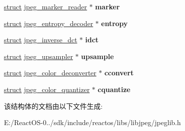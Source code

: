\begin{DoxyCompactItemize}
\hyperlink{interfacestruct}{struct} \hyperlink{structjpeg__marker__reader}{jpeg\+\_\+marker\+\_\+reader} $\ast$ {\bfseries marker}
\item 
\mbox{\label{structjpeg__decompress__struct_ac53f055b3d8103caa6c7ba4b4975eb5b}} 
\hyperlink{interfacestruct}{struct} \hyperlink{structjpeg__entropy__decoder}{jpeg\+\_\+entropy\+\_\+decoder} $\ast$ {\bfseries entropy}
\item 
\mbox{\label{structjpeg__decompress__struct_a2ef67a2829f8ecebb1af0ed440bff8bf}} 
\hyperlink{interfacestruct}{struct} \hyperlink{structjpeg__inverse__dct}{jpeg\+\_\+inverse\+\_\+dct} $\ast$ {\bfseries idct}
\item 
\mbox{\label{structjpeg__decompress__struct_a80ad7e1c14488a065697b09679479c5d}} 
\hyperlink{interfacestruct}{struct} \hyperlink{structjpeg__upsampler}{jpeg\+\_\+upsampler} $\ast$ {\bfseries upsample}
\item 
\mbox{\label{structjpeg__decompress__struct_a1f88347e58f8f9d93954aa885f3497fb}} 
\hyperlink{interfacestruct}{struct} \hyperlink{structjpeg__color__deconverter}{jpeg\+\_\+color\+\_\+deconverter} $\ast$ {\bfseries cconvert}
\item 
\mbox{\label{structjpeg__decompress__struct_ace3f4f51b8cf7bd24428ae9d10f5ddf1}} 
\hyperlink{interfacestruct}{struct} \hyperlink{structjpeg__color__quantizer}{jpeg\+\_\+color\+\_\+quantizer} $\ast$ {\bfseries cquantize}
\end{DoxyCompactItemize}


该结构体的文档由以下文件生成\+:\begin{DoxyCompactItemize}
\item 
E\+:/\+React\+O\+S-\/0../sdk/include/reactos/libs/libjpeg/jpeglib.\+h\end{DoxyCompactItemize}
